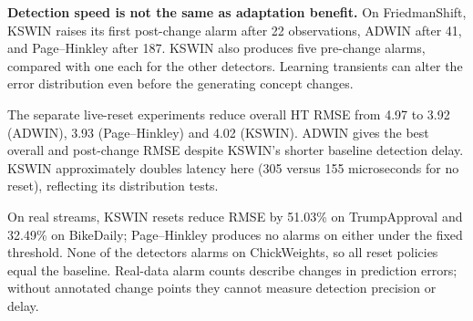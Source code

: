 \textbf{Detection speed is not the same as adaptation benefit.} On FriedmanShift, KSWIN raises its first post-change alarm after 22 observations, ADWIN after 41, and Page--Hinkley after 187. KSWIN also produces five pre-change alarms, compared with one each for the other detectors. Learning transients can alter the error distribution even before the generating concept changes.

The separate live-reset experiments reduce overall HT RMSE from 4.97 to 3.92 (ADWIN), 3.93 (Page--Hinkley) and 4.02 (KSWIN). ADWIN gives the best overall and post-change RMSE despite KSWIN's shorter baseline detection delay. KSWIN approximately doubles latency here (305 versus 155 microseconds for no reset), reflecting its distribution tests.

On real streams, KSWIN resets reduce RMSE by 51.03\% on TrumpApproval and 32.49\% on BikeDaily; Page--Hinkley produces no alarms on either under the fixed threshold. None of the detectors alarms on ChickWeights, so all reset policies equal the baseline. Real-data alarm counts describe changes in prediction errors; without annotated change points they cannot measure detection precision or delay.
